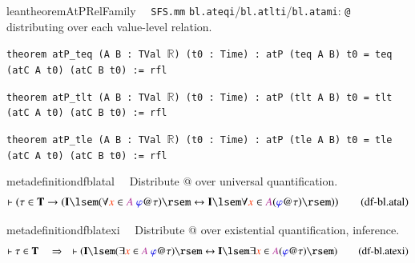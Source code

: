 \begin{restatable}{leantheorem}{AtPRelFamily}~~ \texttt{SFS.mm} \texttt{bl.ateqi}/\texttt{bl.atlti}/\texttt{bl.atami}: \texttt{@} distributing over each value-level relation.

\texttt{\textcolor{leancolor}{theorem} \textcolor{leanyellow}{atP\_teq} (A B : TVal $\mathbb{R}$) (t0 : Time) : atP (teq A B) t0 = teq (atC A t0) (atC B t0) := rfl}

\texttt{\textcolor{leancolor}{theorem} \textcolor{leanyellow}{atP\_tlt} (A B : TVal $\mathbb{R}$) (t0 : Time) : atP (tlt A B) t0 = tlt (atC A t0) (atC B t0) := rfl}

\texttt{\textcolor{leancolor}{theorem} \textcolor{leanyellow}{atP\_tle} (A B : TVal $\mathbb{R}$) (t0 : Time) : atP (tle A B) t0 = tle (atC A t0) (atC B t0) := rfl}
\label{atP_teq}
\label{atP_tlt}
\label{atP_tle}
\end{restatable}

\begin{restatable}{metadefinition}{dfblatal}~~ Distribute @ over universal
quantification.
\begin{align}
\vdash ( \tau \in \mathbf{T} \rightarrow ( \mathbf{I} \lsem ( \forall \msc{x}
    \in \mc{A}~\mw{\varphi} @ \tau ) \rsem \leftrightarrow \mathbf{I} \lsem
    \forall \msc{x} \in \mc{A} ( \mw{\varphi} @ \tau ) \rsem )
    )\label{eq:df-bl.atal}\tag{df-bl.atal}
\end{align}
\end{restatable}

\begin{restatable}{metadefinition}{dfblatexi}~~ Distribute @ over existential
quantification, inference.
\begin{align}
\vdash \tau \in \mathbf{T}\quad\Rightarrow\quad \vdash ( \mathbf{I} \lsem (
    \exists \msc{x} \in \mc{A}~\mw{\varphi} @ \tau ) \rsem \leftrightarrow
    \mathbf{I} \lsem \exists \msc{x} \in \mc{A} ( \mw{\varphi} @ \tau ) \rsem
    )\label{eq:df-bl.atexi}\tag{df-bl.atexi}
\end{align}
\end{restatable}

